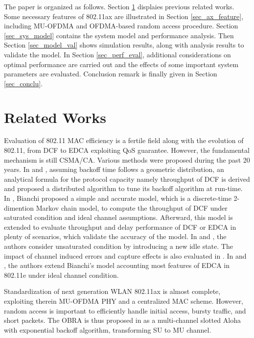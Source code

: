 \documentclass[journal]{IEEEtran}
\begin{document}
The paper is organized as follows.
Section \ref{sec_ref} displaies previous related works. 
Some necessary features of 802.11ax are illustrated in Section \ref{sec_ax_feature}, including MU-OFDMA and OFDMA-based random access procedure.
Section \ref{sec_sys_model} contains the system model and performance analysis. 
Then Section \ref{sec_model_val} shows simulation results, along with analysis results to validate the model.
In Section \ref{sec_perf_eval}, additional considerations on optimal performance are carried out and the effects of some important system parameters are evaluated. 
Conclusion remark is finally given in Section \ref{sec_conclu}.

\section{Related Works} \label{sec_ref}
Evaluation of 802.11 MAC efficiency is a fertile field along with the evolution of 802.11, from DCF to EDCA \cite{perahia2013next} exploiting QoS guarantee. 
However, the fundamental mechanism is still CSMA/CA.
Various methods were proposed during the past 20 years. In \cite{ho1996performance}\cite{cali2000ieee} and \cite{cali2000dynamic}, assuming backoff time follows a geometric distribution, an analytical formula for the protocol capacity namely throughput of DCF is derived and \cite{cali2000dynamic} proposed a distributed algorithm to tune its backoff algorithm at run-time.
In \cite{bianchi2000performance}, Bianchi proposed a simple and accurate model, which is a discrete-time 2-dimention Markov chain model, to compute the throughput of DCF under saturated condition and ideal channel assumptions.
Afterward, this model is extended to evaluate throughput and delay performance of DCF or EDCA in plenty of scenarios, which validate the accuracy of the model. 
In \cite{liaw2005performance} and \cite{daneshgaran2008unsaturated}, the authors consider unsaturated condition by introducing a new idle state. 
The impact of channel induced errors and capture effects is also evaluated in \cite{daneshgaran2008unsaturated}.
In \cite{kong2004performance} and \cite{roberts1975aloha}, the authors extend Bianchi's model accounting most features of EDCA in 802.11e under ideal channel condition.

Standardization of next generation WLAN 802.11ax \cite{draft_ax} is almost complete, exploiting therein MU-OFDMA PHY and a centralized MAC scheme.
However, random access is important to efficiently handle initial access, bursty traffic, and short packets. 
The OBRA is thus proposed in \cite{draft_ax} as a multi-channel slotted Aloha with exponential backoff algorithm, transforming SU to MU channel.
\end{document}
